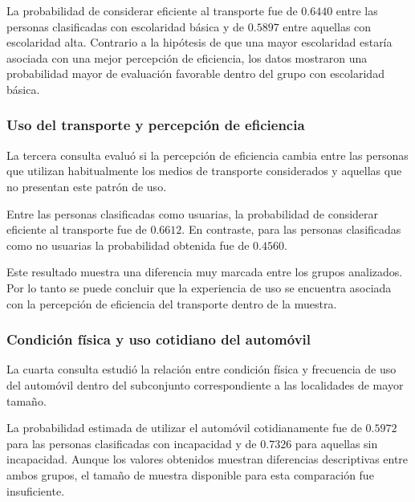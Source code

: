 \documentclass[
  letterpaper,
  DIV=11,
  numbers=noendperiod]{scrartcl}
\begin{document}
La probabilidad de considerar eficiente al transporte fue de $0.6440$ entre las 
personas clasificadas con escolaridad básica y de $0.5897$ entre aquellas con 
escolaridad alta. Contrario a la hipótesis de que una mayor escolaridad estaría 
asociada con una mejor percepción de eficiencia, los datos mostraron una 
probabilidad mayor de evaluación favorable dentro del grupo con escolaridad básica.

\subsubsection{Uso del transporte y percepción de eficiencia}

La tercera consulta evaluó si la percepción de eficiencia cambia entre las personas 
que utilizan habitualmente los medios de transporte considerados y aquellas que 
no presentan este patrón de uso.

Entre las personas clasificadas como usuarias, la probabilidad de considerar 
eficiente al transporte fue de $0.6612$. En contraste, para las personas 
clasificadas como no usuarias la probabilidad obtenida fue de $0.4560$.

Este resultado muestra una diferencia muy 
marcada entre los grupos analizados. Por lo tanto se puede concluir que 
la experiencia de uso se encuentra asociada con la percepción de eficiencia 
del transporte dentro de la muestra. 


\subsubsection{Condición física y uso cotidiano del automóvil}

La cuarta consulta estudió la relación entre condición física y frecuencia de uso 
del automóvil dentro del subconjunto correspondiente a las localidades de mayor 
tamaño.

La probabilidad estimada de utilizar el automóvil cotidianamente fue de $0.5972$ 
para las personas clasificadas con incapacidad y de $0.7326$ para aquellas sin 
incapacidad. Aunque los valores obtenidos muestran diferencias descriptivas entre 
ambos grupos, el tamaño de muestra disponible para esta comparación fue insuficiente.
\end{document}
